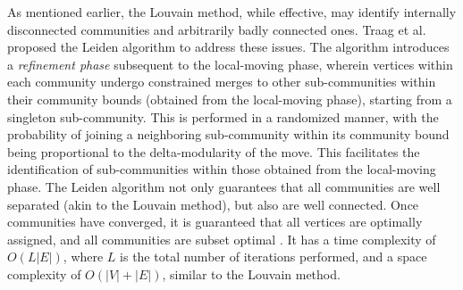 As mentioned earlier, the Louvain method, while effective, may identify internally disconnected communities and arbitrarily badly connected ones. Traag et al. \cite{com-traag19} proposed the Leiden algorithm to address these issues. The algorithm introduces a \textit{refinement phase} subsequent to the local-moving phase, wherein vertices within each community undergo constrained merges to other sub-communities within their community bounds (obtained from the local-moving phase), starting from a singleton sub-community. This is performed in a randomized manner, with the probability of joining a neighboring sub-community within its community bound being proportional to the delta-modularity of the move. This facilitates the identification of sub-communities within those obtained from the local-moving phase. The Leiden algorithm not only guarantees that all communities are well separated (akin to the Louvain method), but also are well connected. Once communities have converged, it is guaranteed that all vertices are optimally assigned, and all communities are subset optimal \cite{com-traag19}. It has a time complexity of $O (L |E|)$, where $L$ is the total number of iterations performed, and a space complexity of $O(|V| + |E|)$, similar to the Louvain method.
